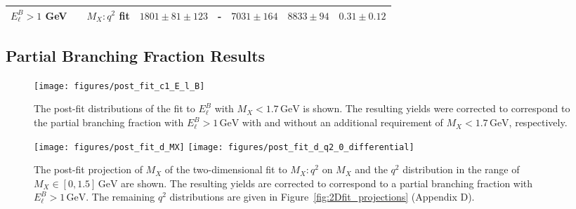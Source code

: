 \documentclass[twocolumn,aps,prd,superscriptaddress,nofootinbib,floatfix,preprintnumbers,a4]{revtex4-1}
\begin{document}
\begin{table*}[t]
\begin{tabular}{lccccccc}
$E_{\ell}^{B} >1$ GeV                                                                                               &               & \multicolumn{1}{l}{$M_{X}:q^{2}$ fit} & $1801 \pm 81 \pm 123$                  & -                                    & $7031 \pm 164$             & $8833 \pm 94$     & $0.31 \pm 0.12$                                                    \\ \hline\hline
\end{tabular}
\label{tab:res_fit_yields}
\end{table*}

\subsection{Partial Branching Fraction Results}\label{sec:partial_BF_res}

\begin{figure}[h!]
 \texttt{[image: figures/post\_fit\_c1\_E\_l\_B]} 
\caption{
  The post-fit distributions of the fit to $E_\ell^B$ with $M_X < 1.7 \, \text{GeV}$ is shown. The resulting yields were corrected to correspond to the partial branching fraction with $E_\ell^B > 1 \, \text{GeV}$ with and without an additional requirement of $M_X < 1.7 \, \text{GeV}$, respectively. 
 }
\label{fig:post_fit_1D_2}
\end{figure}

\begin{figure}[h!]
 \texttt{[image: figures/post\_fit\_d\_MX]} 
  \texttt{[image: figures/post\_fit\_d\_q2\_0\_differential]}
\caption{
  The post-fit projection of $M_{X}$ of the two-dimensional fit to $M_X:q^2$ on $M_{X}$ and the $q^2$ distribution in the range of $M_X \in [0, 1.5] \, \mathrm{GeV}$ are shown. The resulting yields are corrected to correspond to a partial branching fraction with $E_\ell^B > 1 \, \text{GeV}$. The remaining $q^2$ distributions are given in Figure~\ref{fig:2Dfit_projections} (Appendix D).
 }
\label{fig:post_fit_2D}
\end{figure}
\end{document}
